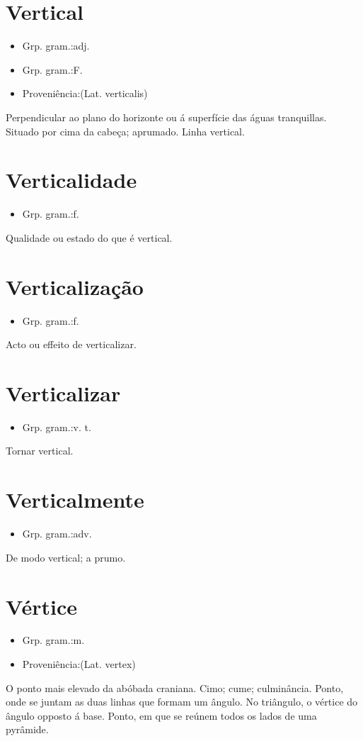 \documentclass{article}
\begin{document}
\section{Vertical}
\begin{itemize}
\item {Grp. gram.:adj.}
\end{itemize}
\begin{itemize}
\item {Grp. gram.:F.}
\end{itemize}
\begin{itemize}
\item {Proveniência:(Lat. \textunderscore verticalis\textunderscore )}
\end{itemize}
Perpendicular ao plano do horizonte ou á superfície das águas tranquillas.
Situado por cima da cabeça; aprumado.
Linha vertical.
\section{Verticalidade}
\begin{itemize}
\item {Grp. gram.:f.}
\end{itemize}
Qualidade ou estado do que é vertical.
\section{Verticalização}
\begin{itemize}
\item {Grp. gram.:f.}
\end{itemize}
Acto ou effeito de verticalizar.
\section{Verticalizar}
\begin{itemize}
\item {Grp. gram.:v. t.}
\end{itemize}
Tornar vertical.
\section{Verticalmente}
\begin{itemize}
\item {Grp. gram.:adv.}
\end{itemize}
De modo vertical; a prumo.
\section{Vértice}
\begin{itemize}
\item {Grp. gram.:m.}
\end{itemize}
\begin{itemize}
\item {Proveniência:(Lat. \textunderscore vertex\textunderscore )}
\end{itemize}
O ponto mais elevado da abóbada craniana.
Cimo; cume; culminância.
Ponto, onde se juntam as duas linhas que formam um ângulo.
No triângulo, o vértice do ângulo opposto á base.
Ponto, em que se reúnem todos os lados de uma pyrâmide.
\end{document}
